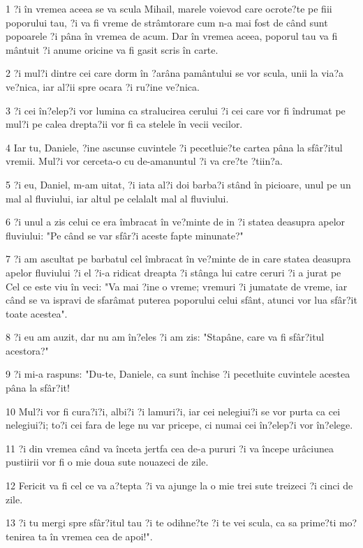 \par 1 ?i în vremea aceea se va scula Mihail, marele voievod care ocrote?te pe fiii poporului tau, ?i va fi vreme de strâmtorare cum n-a mai fost de când sunt popoarele ?i pâna în vremea de acum. Dar în vremea aceea, poporul tau va fi mântuit ?i anume oricine va fi gasit scris în carte.
\par 2 ?i mul?i dintre cei care dorm în ?arâna pamântului se vor scula, unii la via?a ve?nica, iar al?ii spre ocara ?i ru?ine ve?nica.
\par 3 ?i cei în?elep?i vor lumina ca stralucirea cerului ?i cei care vor fi îndrumat pe mul?i pe calea drepta?ii vor fi ca stelele în vecii vecilor.
\par 4 Iar tu, Daniele, ?ine ascunse cuvintele ?i pecetluie?te cartea pâna la sfâr?itul vremii. Mul?i vor cerceta-o cu de-amanuntul ?i va cre?te ?tiin?a.
\par 5 ?i eu, Daniel, m-am uitat, ?i iata al?i doi barba?i stând în picioare, unul pe un mal al fluviului, iar altul pe celalalt mal al fluviului.
\par 6 ?i unul a zis celui ce era îmbracat în ve?minte de in ?i statea deasupra apelor fluviului: "Pe când se var sfâr?i aceste fapte minunate?"
\par 7 ?i am ascultat pe barbatul cel îmbracat în ve?minte de in care statea deasupra apelor fluviului ?i el ?i-a ridicat dreapta ?i stânga lui catre ceruri ?i a jurat pe Cel ce este viu în veci: "Va mai ?ine o vreme; vremuri ?i jumatate de vreme, iar când se va ispravi de sfarâmat puterea poporului celui sfânt, atunci vor lua sfâr?it toate acestea".
\par 8 ?i eu am auzit, dar nu am în?eles ?i am zis: "Stapâne, care va fi sfâr?itul acestora?"
\par 9 ?i mi-a raspuns: "Du-te, Daniele, ca sunt închise ?i pecetluite cuvintele acestea pâna la sfâr?it!
\par 10 Mul?i vor fi cura?i?i, albi?i ?i lamuri?i, iar cei nelegiui?i se vor purta ca cei nelegiui?i; to?i cei fara de lege nu var pricepe, ci numai cei în?elep?i vor în?elege.
\par 11 ?i din vremea când va înceta jertfa cea de-a pururi ?i va începe urâciunea pustiirii vor fi o mie doua sute nouazeci de zile.
\par 12 Fericit va fi cel ce va a?tepta ?i va ajunge la o mie trei sute treizeci ?i cinci de zile.
\par 13 ?i tu mergi spre sfâr?itul tau ?i te odihne?te ?i te vei scula, ca sa prime?ti mo?tenirea ta în vremea cea de apoi!".


